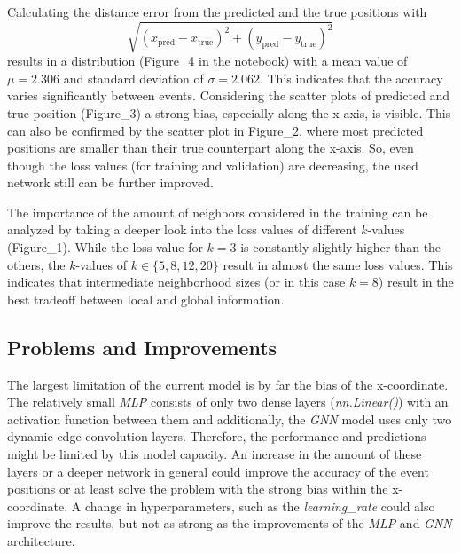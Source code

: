 Calculating the distance error from the predicted and the true positions with
\begin{equation}
  \nonumber
  \sqrt{\left(x_\text{pred} - x_\text{true}\right)^2 + \left(y_\text{pred} - y_\text{true}\right)^2}
\end{equation}
results in a distribution (Figure\_4 in the notebook) with a mean value of $\mu = 2.306$ and standard deviation of $\sigma = 2.062$. 
This indicates that the accuracy varies significantly between events.
Considering the scatter plots of predicted and true position (Figure\_3) a strong bias, especially along the x-axis, is visible.
This can also be confirmed by the scatter plot in Figure\_2, where most predicted positions are smaller than their true counterpart along the x-axis.
So, even though the loss values (for training and validation) are decreasing, the used network still can be further improved.

The importance of the amount of neighbors considered in the training can be analyzed by taking a deeper look into the loss values of different $k$-values (Figure\_1).
While the loss value for $k=3$ is constantly slightly higher than the others, the $k$-values of $k \in \{5, 8, 12, 20\}$ result in almost the same loss values.
This indicates that intermediate neighborhood sizes (or in this case $k=8$) result in the best tradeoff between local and global information.

\subsection{Problems and Improvements}
The largest limitation of the current model is by far the bias of the x-coordinate. 
The relatively small \textit{MLP} consists of only two dense layers (\textit{nn.Linear()}) with an activation function between them and
additionally, the \textit{GNN} model uses only two dynamic edge convolution layers. 
Therefore, the performance and predictions might be limited by this model capacity.
An increase in the amount of these layers or a deeper network in general could improve the accuracy of the event positions 
or at least solve the problem with the strong bias within the x-coordinate.
A change in hyperparameters, such as the \textit{learning\_rate} could also improve the results, but not as strong as the improvements of the \textit{MLP} and \textit{GNN} architecture.



